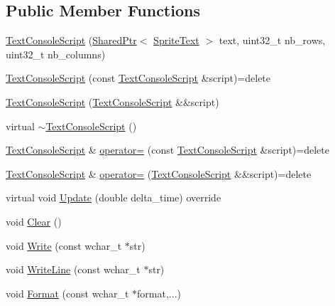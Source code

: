 \subsection*{Public Member Functions}
\begin{DoxyCompactItemize}
\item 
\hyperlink{classmage_1_1_text_console_script_a5da87d9a6b1a70f31a9b906beb5587bc}{Text\+Console\+Script} (\hyperlink{namespacemage_a1e01ae66713838a7a67d30e44c67703e}{Shared\+Ptr}$<$ \hyperlink{classmage_1_1_sprite_text}{Sprite\+Text} $>$ text, uint32\+\_\+t nb\+\_\+rows, uint32\+\_\+t nb\+\_\+columns)
\item 
\hyperlink{classmage_1_1_text_console_script_ad31e204ced04dc42fb98397df6015198}{Text\+Console\+Script} (const \hyperlink{classmage_1_1_text_console_script}{Text\+Console\+Script} \&script)=delete
\item 
\hyperlink{classmage_1_1_text_console_script_a6d245efb103011f1b2e2c43c590c22bf}{Text\+Console\+Script} (\hyperlink{classmage_1_1_text_console_script}{Text\+Console\+Script} \&\&script)
\item 
virtual \hyperlink{classmage_1_1_text_console_script_a3269d6b792053d4ce13d63103ca5b4e9}{$\sim$\+Text\+Console\+Script} ()
\item 
\hyperlink{classmage_1_1_text_console_script}{Text\+Console\+Script} \& \hyperlink{classmage_1_1_text_console_script_af7da3f0735f72fed0d6fc265b6ae07e9}{operator=} (const \hyperlink{classmage_1_1_text_console_script}{Text\+Console\+Script} \&script)=delete
\item 
\hyperlink{classmage_1_1_text_console_script}{Text\+Console\+Script} \& \hyperlink{classmage_1_1_text_console_script_a2a14c6a981fe7ded4e7a4fa5480ac6cb}{operator=} (\hyperlink{classmage_1_1_text_console_script}{Text\+Console\+Script} \&\&script)=delete
\item 
virtual void \hyperlink{classmage_1_1_text_console_script_a7b1acbf48376b650c08fa941a63ffa98}{Update} (double delta\+\_\+time) override
\item 
void \hyperlink{classmage_1_1_text_console_script_aff5acec462f505735720a17d541ba912}{Clear} ()
\item 
void \hyperlink{classmage_1_1_text_console_script_a659586a498f8ff0f55aa2a3f25f0828b}{Write} (const wchar\+\_\+t $\ast$str)
\item 
void \hyperlink{classmage_1_1_text_console_script_a24fe33795c69e70d07a680826cfafcc1}{Write\+Line} (const wchar\+\_\+t $\ast$str)
\item 
void \hyperlink{classmage_1_1_text_console_script_a4d9ba97e4ff4ad5390b20e5523a20e92}{Format} (const wchar\+\_\+t $\ast$format,...)
\end{DoxyCompactItemize}

